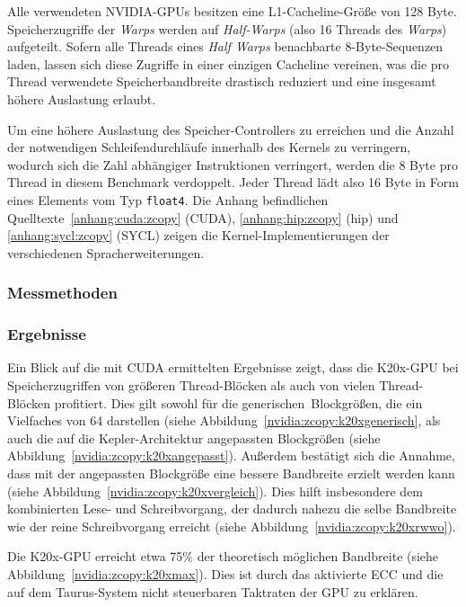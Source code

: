 Alle verwendeten NVIDIA-GPUs besitzen eine L1-Cacheline-Größe von \num{128}
Byte. Speicherzugriffe der \textit{Warps} werden auf \textit{Half-Warps} (also
\num{16} Threads des \textit{Warps}) aufgeteilt. Sofern alle Threads eines
\textit{Half Warps} benachbarte \num{8}-Byte-Sequenzen laden, lassen sich diese
Zugriffe in einer einzigen Cacheline vereinen, was die pro Thread verwendete
Speicherbandbreite drastisch reduziert und eine insgesamt höhere Auslastung
erlaubt.

Um eine höhere Auslastung des Speicher-Controllers zu erreichen und die Anzahl
der notwendigen Schleifendurchläufe innerhalb des Kernels zu verringern, wodurch
sich die Zahl abhängiger Instruktionen verringert, werden die \num{8} Byte pro
Thread in diesem Benchmark verdoppelt. Jeder Thread lädt also \num{16} Byte in
Form eines Elements vom Typ \texttt{float4}. Die Anhang befindlichen
Quelltexte~\ref{anhang:cuda:zcopy} (CUDA), \ref{anhang:hip:zcopy} (\gls{hip})
und \ref{anhang:sycl:zcopy} (SYCL) zeigen die Kernel-Implementierungen der
verschiedenen Spracherweiterungen.

\subsubsection{Messmethoden}

\subsubsection{Ergebnisse}

Ein Blick auf die mit CUDA ermittelten Ergebnisse zeigt, dass die K20x-GPU bei
Speicherzugriffen von größeren Thread-Blöcken als auch von vielen Thread-Blöcken
profitiert. Dies gilt sowohl für die \glqq generischen\grqq\ Blockgrößen, die
ein Vielfaches von \num{64} darstellen (siehe 
Abbildung~\ref{nvidia:zcopy:k20xgenerisch}, als auch die auf die
Kepler-Architektur angepassten Blockgrößen (siehe
Abbildung~\ref{nvidia:zcopy:k20xangepasst}). Außerdem bestätigt sich die
Annahme, dass mit der angepassten Blockgröße eine bessere Bandbreite erzielt
werden kann (siehe Abbildung~\ref{nvidia:zcopy:k20xvergleich}). Dies hilft
insbesondere dem kombinierten Lese- und Schreibvorgang, der dadurch nahezu die
selbe Bandbreite wie der reine Schreibvorgang erreicht (siehe
Abbildung~\ref{nvidia:zcopy:k20xrwwo}).

Die K20x-GPU erreicht etwa 75\% der theoretisch möglichen Bandbreite (siehe
Abbildung~\ref{nvidia:zcopy:k20xmax}). Dies ist durch das aktivierte ECC und
die auf dem Taurus-System nicht steuerbaren Taktraten der GPU zu erklären.

